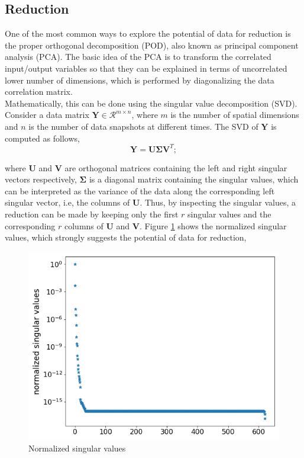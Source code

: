 \documentclass{anstrans}
\begin{document}
\subsection{Reduction}
One of the most common ways to explore the potential of data for reduction is the proper orthogonal decomposition (POD), also known as principal component analysis (PCA).
The basic idea of the PCA is to transform the correlated input/output variables so that they can be explained in terms of uncorrelated lower number of dimensions, which is performed by diagonalizing the data correlation matrix.\\
Mathematically, this can be done using the singular value decomposition (SVD). Consider a data matrix $\textbf{Y} \in \mathcal{R}^{m\times n}$,  where $m$ is the number of spatial dimensions and $n$ is the number of data snapshots at different times. The SVD of $\textbf{Y}$ is computed as follows, 
\begin{equation}
 \textbf{Y} =\textbf{U}\boldsymbol{\Sigma}\textbf{V}^T;
\end{equation}

where $\textbf{U}$ and $\textbf{V}$ are orthogonal matrices containing the left and right singular vectors respectively, $\boldsymbol{\Sigma}$ is a diagonal matrix containing the singular values, 
which can be interpreted as the variance of the data along the corresponding left singular vector, i.e, the columns of $\textbf{U}$. 
Thus, by inspecting the singular values, a reduction can be made by keeping only the first $r$ singular values and the corresponding $r$ columns of $\textbf{U}$ and $\textbf{V}$.
Figure \ref{fig:svd} shows the normalized singular values, which strongly suggests the potential of data for reduction, 
\begin{figure}[!h]
	\centering
	\includegraphics[scale=0.4]{./figs/singular_values.png}
	\caption{Normalized singular values}
	\label{fig:svd}
\end{figure}
\end{document}
